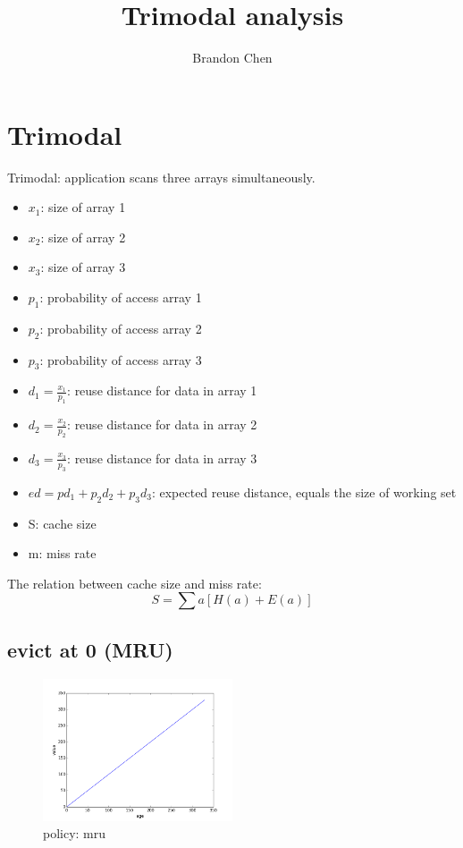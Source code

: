 \documentclass[12pt, letterpaper]{article}
\title{Trimodal analysis}
\author{Brandon Chen}
\begin{document}
\maketitle
\section{Trimodal}

Trimodal: application scans three arrays simultaneously.

\begin{itemize}
\item $x_1$: size of array 1
\item $x_2$: size of array 2
\item $x_3$: size of array 3
\item $p_1$: probability of access array 1
\item $p_2$: probability of access array 2
\item $p_3$: probability of access array 3
\item $d_1 = \frac{x_1}{p_1}$: reuse distance for data in array 1
\item $d_2 = \frac{x_2}{p_2}$: reuse distance for data in array 2
\item $d_3 = \frac{x_3}{p_3}$: reuse distance for data in array 3
\item $ed = p d_1 + p_2 d_2 + p_3 d_3 $: expected reuse distance, equals the
size of working set 
\item S: cache size
\item m: miss rate
\end{itemize}

The relation between cache size and miss rate:
\begin{equation}
S = \sum a [H(a) + E(a)]
\end{equation}

\subsection{evict at 0 (MRU)}

\begin{figure}[H]
\centering
\includegraphics[width=0.5\textwidth]{mru_value}
\caption{policy: mru}
\end{figure}
\end{document}
